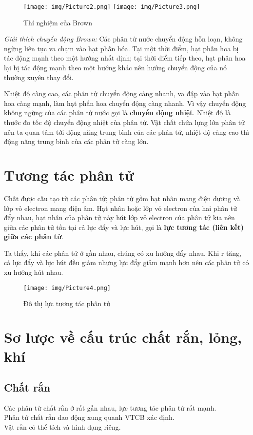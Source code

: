 \documentclass[a4paper, 12pt]{article}
\begin{document}
\begin{figure}[H]
	\centering
	\texttt{[image: img/Picture2.png]}
	\texttt{[image: img/Picture3.png]}
	\caption{Thí nghiệm của Brown}
\end{figure}

\textit{Giải thích chuyển động Brown:} Các phân tử nước chuyển động hỗn loạn, không ngừng liên tục va chạm vào hạt phấn hóa. Tại một thời điểm, hạt phấn hoa bị tác động mạnh theo một hướng nhất định; tại thời điểm tiếp theo, hạt phân hoa lại bị tác động mạnh theo một hướng khác nên hướng chuyển động của nó thường xuyên thay đổi.


Nhiệt độ càng cao, các phân tử chuyển động càng nhanh, va đập vào hạt phấn hoa càng mạnh, làm hạt phấn hoa chuyển động càng nhanh. Vì vậy chuyển động không ngừng của các phân tử nước gọi là \textbf{chuyển động nhiệt}. Nhiệt độ là thước đo tốc độ chuyển động nhiệt của phân tử. Vật chất chứa lựng lớn phân tử nên ta quan tâm tới động năng trung bình của các phân tử, nhiệt độ càng cao thì động năng trung bình của các phân tử càng lớn.


\section{Tương tác phân tử}

Chất được cấu tạo từ các phân tử; phân tử gồm hạt nhân mang điện dương và lớp vỏ electron mang điện âm. Hạt nhân hoặc lớp vỏ electron của hai phân tử đẩy nhau, hạt nhân của phân tử này hút lớp vỏ electron của phân tử kia nên giữa các phân tử tồn tại cả lực đẩy và lực hút, gọi là \textbf{lực tương tác (liên kết) giữa các phân tử}.

Ta thấy, khi các phân tử ở gần nhau, chúng có xu hướng đẩy nhau. Khi r tăng, cả lực đẩy và lực hút đều giảm nhưng lực đẩy giảm mạnh hơn nên các phân tử có xu hướng hút nhau. 

\begin{figure}[H]
	\centering
	\texttt{[image: img/Picture4.png]}
	\caption{Đồ thị lực tương tác phân tử}
\end{figure}

\section{Sơ lược về cấu trúc chất rắn, lỏng, khí}
\subsection{Chất rắn}
\raisebox{0.3ex}{\tiny$\bullet$} Các phân tử chất rắn ở rất gần nhau, lực tương tác phân tử rất mạnh.\\
\raisebox{0.3ex}{\tiny$\bullet$} Phân tử chất rắn dao động xung quanh VTCB xác định.\\
\raisebox{0.3ex}{\tiny$\bullet$} Vật rắn có thể tích và hình dạng riêng.\\
\end{document}
